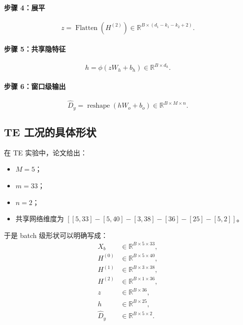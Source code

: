 \documentclass[UTF8]{ctexart}
\begin{document}
\paragraph{步骤 4：展平}
\begin{equation}
    z = \operatorname{Flatten}(H^{(2)}) \in \mathbb{R}^{B \times (d_1-k_1-k_2+2)}.
\end{equation}

\paragraph{步骤 5：共享隐特征}
\begin{equation}
    h = \phi(z W_h + b_h) \in \mathbb{R}^{B \times d_h}.
\end{equation}

\paragraph{步骤 6：窗口级输出}
\begin{equation}
    \hat{D}_y = \operatorname{reshape}(h W_o + b_o) \in \mathbb{R}^{B \times M \times n}.
\end{equation}

\subsection{TE 工况的具体形状}

在 TE 实验中，论文给出：
\begin{itemize}
    \item $M=5$；
    \item $m=33$；
    \item $n=2$；
    \item 共享网络维度为 $[[5,33]-[5,40]-[3,38]-[36]-[25]-[5,2]]$。
\end{itemize}

于是 batch 级形状可以明确写成：
\begin{align}
    X_b &\in \mathbb{R}^{B \times 5 \times 33}, \\
    H^{(0)} &\in \mathbb{R}^{B \times 5 \times 40}, \\
    H^{(1)} &\in \mathbb{R}^{B \times 3 \times 38}, \\
    H^{(2)} &\in \mathbb{R}^{B \times 1 \times 36}, \\
    z &\in \mathbb{R}^{B \times 36}, \\
    h &\in \mathbb{R}^{B \times 25}, \\
    \hat{D}_y &\in \mathbb{R}^{B \times 5 \times 2}.
\end{align}
\end{document}
